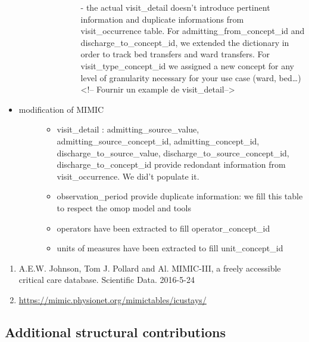 \begin{itemize}
\begin{description}
\begin{itemize}
\begin{description}
    - the actual visit\_detail doesn't introduce pertinent information
    and duplicate informations from visit\_occurrence table. For
    admitting\_from\_concept\_id and discharge\_to\_concept\_id, we
    extended the dictionary in order to track bed transfers and ward
    transfers. For visit\_type\_concept\_id we assigned a new concept
    for any level of granularity necessary for your use case (ward,
    bed\ldots{}) \textless{}!-- Fournir un example de
    visit\_detail--\textgreater{}
    \end{description}
  \end{itemize}
  \end{description}
\item
  \begin{description}
  \item[modification of MIMIC]
  \begin{itemize}
  \tightlist
  \item
    visit\_detail : admitting\_source\_value,
    admitting\_source\_concept\_id, admitting\_concept\_id,
    discharge\_to\_source\_value, discharge\_to\_source\_concept\_id,
    discharge\_to\_concept\_id provide redondant information from
    visit\_occurrence. We did't populate it.
  \item
    observation\_period provide duplicate information: we fill this
    table to respect the omop model and tools
  \item
    operators have been extracted to fill operator\_concept\_id
  \item
    units of measures have been extracted to fill unit\_concept\_id
  \end{itemize}
  \end{description}
\end{itemize}

\begin{enumerate}
\def\labelenumi{\arabic{enumi}.}
\tightlist
\item
  A.E.W. Johnson, Tom J. Pollard and Al. MIMIC-III, a freely accessible
  critical care database. Scientific Data. 2016-5-24
\item
  \url{https://mimic.physionet.org/mimictables/icustays/}
\end{enumerate}

\subsection{Additional structural
contributions}\label{additional-structural-contributions}

